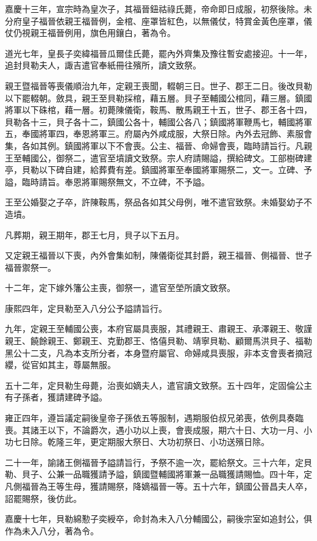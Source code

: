 \begin{pinyinscope}
嘉慶十三年，宣宗時為皇次子，其福晉鈕祜祿氏薨，帝命即日成服，初祭後除。未分府皇子福晉依親王福晉例，金棺、座罩皆紅色，以無儀仗，特賞金黃色座罩，儀仗仍視親王福晉例用，旗色用鑲白，著為令。

道光七年，皇長子奕緯福晉瓜爾佳氏薨，罷內外齊集及豫往暫安處接迎。十一年，追封貝勒夫人，諏吉遣官奉紙冊往殯所，讀文致祭。

親王暨福晉等喪儀順治九年，定親王喪聞，輟朝三日。世子、郡王二日。後改貝勒以下罷輟朝。斂具，親王至貝勒採棺，藉五層。貝子至輔國公棺同，藉三層。鎮國將軍以下硃棺，藉一層。初薨陳儀衛，鞍馬、散馬親王十五，世子、郡王各十四，貝勒各十三，貝子各十二，鎮國公各十，輔國公各八；鎮國將軍鞭馬七，輔國將軍五，奉國將軍四，奉恩將軍三。府屬內外咸成服，大祭日除。內外去冠飾、素服會集，各如其例。鎮國將軍以下不會喪。公主、福晉、命婦會喪，臨時請旨行。凡親王至輔國公，御祭二，遣官至墳讀文致祭。宗人府請賜謚，撰給碑文。工部樹碑建亭，貝勒以下碑自建，給葬費有差。鎮國將軍至奉國將軍賜祭二，文一。立碑、予謚，臨時請旨。奉恩將軍賜祭無文，不立碑，不予謚。

王至公婚娶之子卒，許陳鞍馬，祭品各如其父母例，唯不遣官致祭。未婚娶幼子不造墳。

凡葬期，親王期年，郡王七月，貝子以下五月。

又定親王福晉以下喪，內外會集如制，陳儀衛從其封爵，親王福晉、側福晉、世子福晉禦祭一。

十二年，定下嫁外籓公主喪，御祭一，遣官至塋所讀文致祭。

康熙四年，定貝勒至入八分公予謚請旨行。

九年，定親王至輔國公喪，本府官屬具喪服，其禮親王、肅親王、承澤親王、敬謹親王、饒餘親王、鄭親王、克勤郡王、恪僖貝勒、靖寧貝勒、顧爾馬洪貝子、福勒黑公十二支，凡為本支所分者，本身暨府屬官、命婦咸具喪服，非本支會喪者摘冠纓，從官如其主，尊屬無服。

五十二年，定貝勒生母薨，治喪如嫡夫人，遣官讀文致祭。五十四年，定固倫公主有子孫者，獲請建碑予謚。

雍正四年，遵旨議定嗣後皇帝子孫依五等服制，遇期服伯叔兄弟喪，依例具奏臨喪。其諸王以下，不論爵次，遇小功以上喪，會喪成服，期六十日、大功一月、小功七日除。乾隆三年，更定期服大祭日、大功初祭日、小功送殯日除。

二十一年，諭諸王側福晉予謚請旨行，予祭不逾一次，罷給祭文。三十六年，定貝勒、貝子、公兼一品職獲請予謚，鎮國暨輔國將軍兼一品職獲請賜恤。四十年，定凡側福晉為王等生母，獲請賜祭，降嫡福晉一等。五十六年，鎮國公晉昌夫人卒，詔罷賜祭，後仿此。

嘉慶十七年，貝勒綿懃子奕綬卒，命封為未入八分輔國公，嗣後宗室如追封公，俱作為未入八分，著為令。


\end{pinyinscope}
